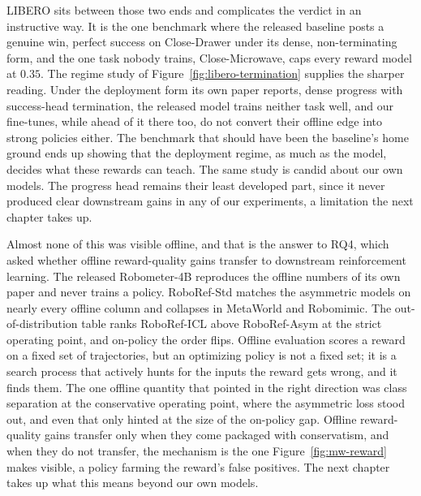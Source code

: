 LIBERO sits between those two ends and complicates the verdict in an instructive way. It is the one benchmark where the released baseline posts a genuine win, perfect success on Close-Drawer under its dense, non-terminating form, and the one task nobody trains, Close-Microwave, caps every reward model at $0.35$. The regime study of Figure~\ref{fig:libero-termination} supplies the sharper reading. Under the deployment form its own paper reports, dense progress with success-head termination, the released model trains neither task well, and our fine-tunes, while ahead of it there too, do not convert their offline edge into strong policies either. The benchmark that should have been the baseline's home ground ends up showing that the deployment regime, as much as the model, decides what these rewards can teach. The same study is candid about our own models. The progress head remains their least developed part, since it never produced clear downstream gains in any of our experiments, a limitation the next chapter takes up.

Almost none of this was visible offline, and that is the answer to RQ4, which asked whether offline reward-quality gains transfer to downstream reinforcement learning. The released Robometer-4B reproduces the offline numbers of its own paper and never trains a policy. RoboRef-Std matches the asymmetric models on nearly every offline column and collapses in MetaWorld and Robomimic. The out-of-distribution table ranks RoboRef-ICL above RoboRef-Asym at the strict operating point, and on-policy the order flips. Offline evaluation scores a reward on a fixed set of trajectories, but an optimizing policy is not a fixed set; it is a search process that actively hunts for the inputs the reward gets wrong, and it finds them. The one offline quantity that pointed in the right direction was class separation at the conservative operating point, where the asymmetric loss stood out, and even that only hinted at the size of the on-policy gap. Offline reward-quality gains transfer only when they come packaged with conservatism, and when they do not transfer, the mechanism is the one Figure~\ref{fig:mw-reward} makes visible, a policy farming the reward's false positives. The next chapter takes up what this means beyond our own models.
